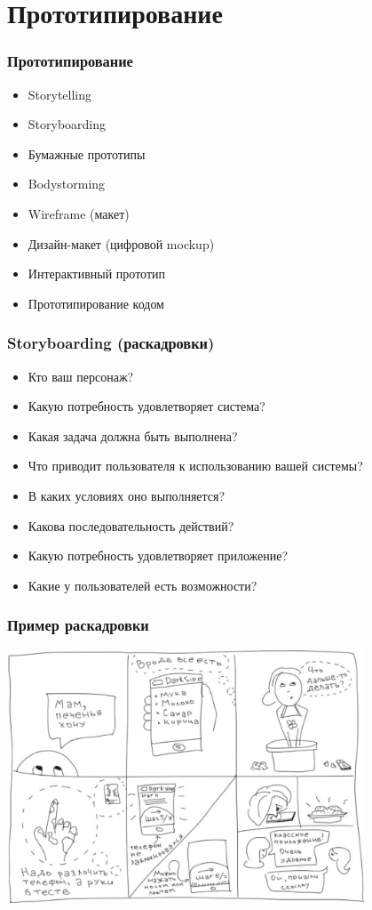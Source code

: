 \documentclass{../../slides-style}
\begin{document}
    \section{Прототипирование}

    \begin{frame}
        \frametitle{Прототипирование}
        \begin{itemize}
            \item Storytelling
            \item Storyboarding
            \item Бумажные прототипы
            \item Bodystorming
            \item Wireframe (макет)
            \item Дизайн-макет (цифровой mockup)
            \item Интерактивный прототип
            \item Прототипирование кодом
        \end{itemize}
    \end{frame}

    \begin{frame}
        \frametitle{Storyboarding (раскадровки)}
        \begin{itemize}
            \item Кто ваш персонаж?
            \item Какую потребность удовлетворяет система?
            \item Какая задача должна быть выполнена?
            \item Что приводит пользователя к использованию вашей системы?
            \item В каких условиях оно выполняется?
            \item Какова последовательность действий?
            \item Какую потребность удовлетворяет приложение?
            \item Какие у пользователей есть возможности?
        \end{itemize}
    \end{frame}

    \begin{frame}
        \frametitle{Пример раскадровки}
        \begin{center}
            \includegraphics[width=0.8\textwidth]{storyboardingExample.png}
        \end{center}
    \end{frame}
\end{document}
